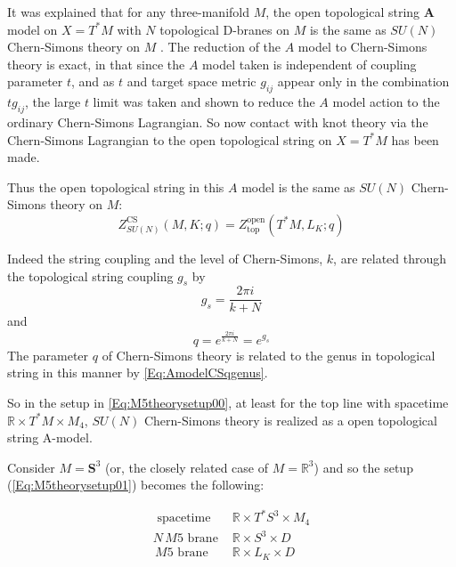 \documentclass[a4paper,titlepage,twoside]{book}
\begin{document}
It was explained that for any three-manifold $M$, the open topological string $\mathbf{A}$ model on $X = T^*M$ with $N$ topological D-branes on $M$ is the same as $SU(N)$ Chern-Simons theory on $M$ \cite{Witten1992}.  The reduction of the $A$ model to Chern-Simons theory is exact, in that since the $A$ model taken is independent of coupling parameter $t$, and as $t$ and target space metric $g_{ij}$ appear only in the combination $tg_{ij}$, the large $t$ limit was taken and shown to reduce the $A$ model action to the ordinary Chern-Simons Lagrangian.  So now contact with knot theory via the Chern-Simons Lagrangian to the open topological string on $X = T^*M$ has been made.

Thus the open topological string in this $A$ model is the same as $SU(N)$ Chern-Simons theory on $M$:
\begin{equation}
Z^{\text{CS}}_{ SU(N) }(M,K;q) = Z^{\text{open}}_{\text{top}  }{ (T^*M, L_K;q) }  \label{eq:CSSUN=opentop}
\end{equation}


Indeed the string coupling and the level of Chern-Simons, $k$, are related through the topological string coupling $g_s$ by 
\[
g_s = \frac{2\pi i}{ k + N}
\]
and 
\begin{equation}
  q = e^{ \frac{ 2 \pi i }{ k + N} } = e^{g_s} \label{Eq:AmodelCSqgenus}
\end{equation}
The parameter $q$ of Chern-Simons theory is related to the genus in topological string in this manner by \ref{Eq:AmodelCSqgenus}.  

So in the setup in \eqref{Eq:M5theorysetup00}, at least for the top line with spacetime $\mathbb{R} \times T^*M \times M_4$, $SU(N)$ Chern-Simons theory is realized as a open topological string A-model.  

Consider $M = \mathbf{S}^3$ (or, the closely related case of $M = \mathbb{R}^3$) and so the setup (\ref{Eq:M5theorysetup01}) becomes the following: 

\begin{equation}
  \begin{aligned}
    \text{ spacetime }  & \mathbb{R} \times T^*S^3 \times M_4 \\ 
    N \, M5 \text{ brane } & \mathbb{R} \times S^3 \times D \\ 
     \, M5 \text{ brane } & \mathbb{R} \times L_K \times D
\end{aligned} \label{Eq:M5theorysetup01}
\end{equation}
\end{document}
